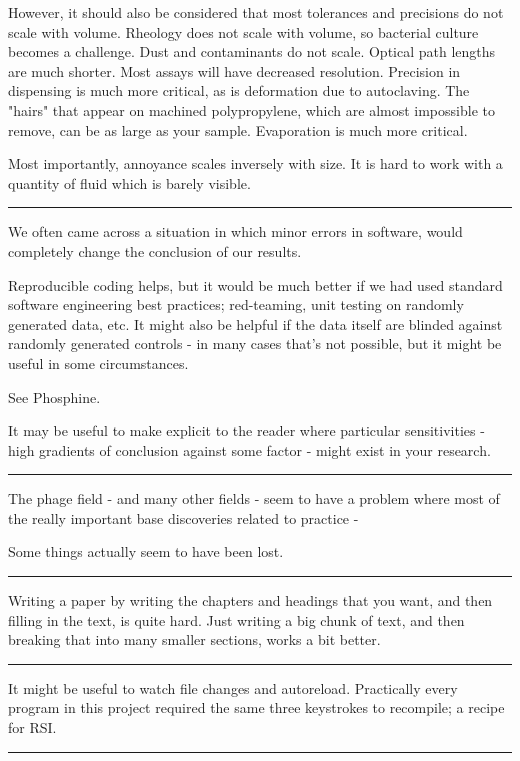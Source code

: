 \documentclass[paper.tex]{subfiles}
\begin{document}
However, it should also be considered that most tolerances and precisions do not scale with volume. 
Rheology does not scale with volume, so bacterial culture becomes a challenge. Dust and contaminants do not scale. Optical path lengths are much shorter. Most assays will have decreased resolution. Precision in dispensing is much more critical, as is deformation due to autoclaving. The "hairs" that appear on machined polypropylene, which are almost impossible to remove, can be as large as your sample. Evaporation is much more critical.

Most importantly, annoyance scales inversely with size. It is hard to work with a quantity of fluid which is barely visible.

\rule{\linewidth}{0.2pt}

We often came across a situation in which minor errors in software,  would completely change the conclusion of our results.

Reproducible coding helps, but it would be much better if we had used standard software engineering best practices; red-teaming, unit testing on randomly generated data, etc. It might also be helpful if the data itself are blinded against randomly generated controls - in many cases that's not possible, but it might be useful in some circumstances.

See Phosphine.

It may be useful to make explicit to the reader where particular sensitivities - high gradients of conclusion against some factor - might exist in your research.

\rule{\linewidth}{0.2pt}

The phage field - and many other fields - seem to have a problem where most of the really important base discoveries related to practice - 

Some things actually seem to have been lost.

\rule{\linewidth}{0.2pt}

Writing a paper by writing the chapters and headings that you want, and then filling in the text, is quite hard. Just writing a big chunk of text, and then breaking that into many smaller sections, works a bit better.


\rule{\linewidth}{0.2pt}

It might be useful to watch file changes and autoreload. Practically every program in this project required the same three keystrokes to recompile; a recipe for RSI.

\rule{\linewidth}{0.2pt}
\end{document}
